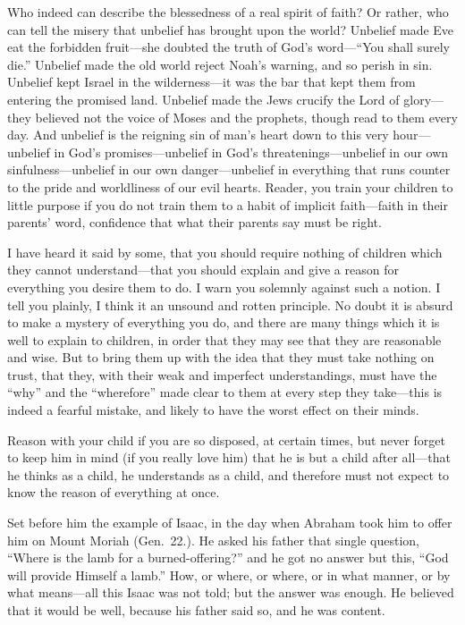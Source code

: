 \documentclass[
]{book}
\begin{document}
Who indeed can describe the blessedness of a real spirit of faith? Or rather, who can tell the misery that unbelief has brought upon the world? Unbelief made Eve eat the forbidden fruit---she doubted the truth of God's word---``You shall surely die.'' Unbelief made the old world reject Noah's warning, and so perish in sin. Unbelief kept Israel in the wilderness---it was the bar that kept them from entering the promised land. Unbelief made the Jews crucify the Lord of glory---they believed not the voice of Moses and the prophets, though read to them every day. And unbelief is the reigning sin of man's heart down to this very hour---unbelief in God's promises---unbelief in God's threatenings---unbelief in our own sinfulness---unbelief in our own danger---unbelief in everything that runs counter to the pride and worldliness of our evil hearts. Reader, you train your children to little purpose if you do not train them to a habit of implicit faith---faith in their parents' word, confidence that what their parents say must be right.

I have heard it said by some, that you should require nothing of children which they cannot understand---that you should explain and give a reason for everything you desire them to do. I warn you solemnly against such a notion. I tell you plainly, I think it an unsound and rotten principle. No doubt it is absurd to make a mystery of everything you do, and there are many things which it is well to explain to children, in order that they may see that they are reasonable and wise. But to bring them up with the idea that they must take nothing on trust, that they, with their weak and imperfect understandings, must have the ``why'' and the ``wherefore'' made clear to them at every step they take---this is indeed a fearful mistake, and likely to have the worst effect on their minds.

Reason with your child if you are so disposed, at certain times, but never forget to keep him in mind (if you really love him) that he is but a child after all---that he thinks as a child, he understands as a child, and therefore must not expect to know the reason of everything at once.

Set before him the example of Isaac, in the day when Abraham took him to offer him on Mount Moriah (Gen.~22.). He asked his father that single question, ``Where is the lamb for a burned-offering?'' and he got no answer but this, ``God will provide Himself a lamb.'' How, or where, or where, or in what manner, or by what means---all this Isaac was not told; but the answer was enough. He believed that it would be well, because his father said so, and he was content.
\end{document}
